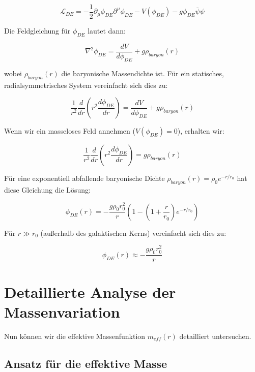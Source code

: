 \documentclass[a4paper,12pt]{article}
\begin{document}
	\begin{equation}
		\mathcal{L}_{DE} = -\frac{1}{2}\partial_\mu \phi_{DE} \partial^\mu \phi_{DE} - V(\phi_{DE}) - g\phi_{DE}\bar{\psi}\psi
	\end{equation}
	
	Die Feldgleichung für $\phi_{DE}$ lautet dann:
	
	\begin{equation}
		\nabla^2 \phi_{DE} = \frac{dV}{d\phi_{DE}} + g\rho_{baryon}(r)
	\end{equation}
	
	wobei $\rho_{baryon}(r)$ die baryonische Massendichte ist. Für ein statisches, radialsymmetrisches System vereinfacht sich dies zu:
	
	\begin{equation}
		\frac{1}{r^2}\frac{d}{dr}\left(r^2\frac{d\phi_{DE}}{dr}\right) = \frac{dV}{d\phi_{DE}} + g\rho_{baryon}(r)
	\end{equation}
	
	Wenn wir ein masseloses Feld annehmen ($V(\phi_{DE}) = 0$), erhalten wir:
	
	\begin{equation}
		\frac{1}{r^2}\frac{d}{dr}\left(r^2\frac{d\phi_{DE}}{dr}\right) = g\rho_{baryon}(r)
	\end{equation}
	
	Für eine exponentiell abfallende baryonische Dichte $\rho_{baryon}(r) = \rho_0 e^{-r/r_0}$ hat diese Gleichung die Lösung:
	
	\begin{equation}
		\phi_{DE}(r) = -\frac{g\rho_0 r_0^2}{r}(1 - (1 + \frac{r}{r_0})e^{-r/r_0})
	\end{equation}
	
	Für $r \gg r_0$ (außerhalb des galaktischen Kerns) vereinfacht sich dies zu:
	
	\begin{equation}
		\phi_{DE}(r) \approx -\frac{g\rho_0 r_0^2}{r}
	\end{equation}
	
	\section{Detaillierte Analyse der Massenvariation}
	
	Nun können wir die effektive Massenfunktion $m_{eff}(r)$ detailliert untersuchen.
	
	\subsection{Ansatz für die effektive Masse}
	
\end{document}
